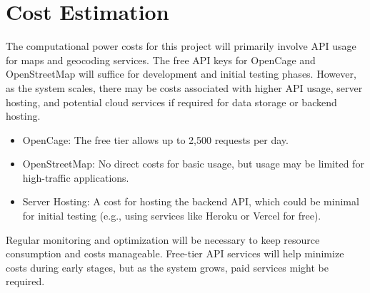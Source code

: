 \section{Cost Estimation}
The computational power costs for this project will primarily involve API usage for maps and geocoding services. The free API keys for OpenCage and OpenStreetMap will suffice for development and initial testing phases. However, as the system scales, there may be costs associated with higher API usage, server hosting, and potential cloud services if required for data storage or backend hosting.

\begin{itemize}
    \item OpenCage: The free tier allows up to 2,500 requests per day.
    \item OpenStreetMap: No direct costs for basic usage, but usage may be limited for high-traffic applications.
    \item Server Hosting: A cost for hosting the backend API, which could be minimal for initial testing (e.g., using services like Heroku or Vercel for free).
\end{itemize}

Regular monitoring and optimization will be necessary to keep resource consumption and costs manageable. Free-tier API services will help minimize costs during early stages, but as the system grows, paid services might be required.

